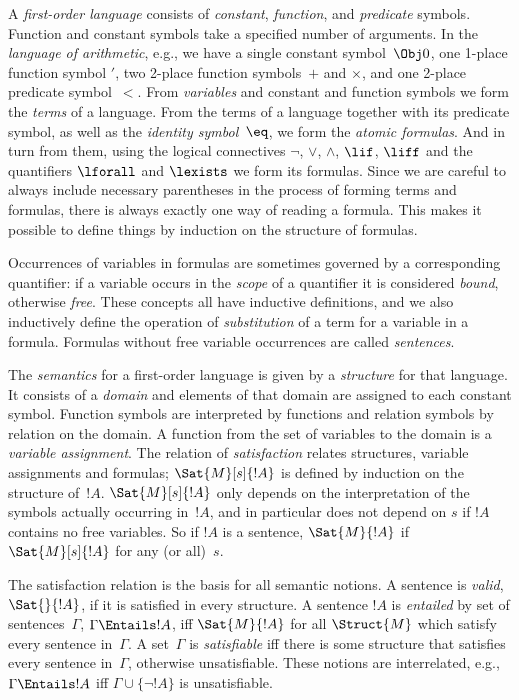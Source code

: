 A \emph{first-order language} consists of \emph{constant},
\emph{function}, and \emph{predicate} symbols. Function and constant
symbols take a specified number of arguments. In the \emph{language
  of arithmetic}, e.g., we have a single constant symbol~$\Obj 0$, one
1-place function symbol $\prime$, two 2-place function symbols~$+$ and
$\times$, and one 2-place predicate symbol~$<$. From \emph{variables}
and constant and function symbols we form the \emph{terms} of a
language. From the terms of a language together with its predicate
symbol, as well as the \emph{identity symbol}~$\eq$, we form the
  \emph{atomic formulas}. And in turn from them, using the logical
  connectives $\lnot$, $\lor$, $\land$, $\lif$, $\liff$ and the
  quantifiers $\lforall$ and $\lexists$ we form its formulas. Since
  we are careful to always include necessary parentheses in the
  process of forming terms and formulas, there is always exactly one
  way of reading a formula. This makes it possible to define things by
  induction on the structure of formulas.

Occurrences of variables in formulas are sometimes governed by a
corresponding quantifier: if a variable occurs in the \emph{scope} of
a quantifier it is considered \emph{bound}, otherwise
\emph{free}. These concepts all have inductive definitions, and we
also inductively define the operation of \emph{substitution} of a term
for a variable in a formula. Formulas without free variable
occurrences are called \emph{sentences}.

The \emph{semantics} for a first-order language is given by a
\emph{structure} for that language. It consists of a \emph{domain} and
elements of that domain are assigned to each constant symbol. Function
symbols are interpreted by functions and relation symbols by relation
on the domain. A function from the set of variables to the domain is
a \emph{variable assignment}. The relation of \emph{satisfaction}
relates structures, variable assignments and formulas;
$\Sat{M}[s]{!A}$ is defined by induction on the structure of~$!A$.
$\Sat{M}[s]{!A}$ only depends on the interpretation of the symbols
actually occurring in~$!A$, and in particular does not depend on $s$
if $!A$ contains no free variables. So if $!A$ is a sentence,
$\Sat{M}{!A}$ if $\Sat{M}[s]{!A}$ for any (or all)~$s$.

The satisfaction relation is the basis for all semantic notions. A
sentence is \emph{valid}, $\Sat{{}}{!A}$, if it is satisfied in every
structure. A sentence $!A$ is \emph{entailed} by set of
sentences~$\Gamma$, $\Gamma \Entails !A$, iff $\Sat{M}{!A}$ for all
$\Struct{M}$ which satisfy every sentence in~$\Gamma$. A set~$\Gamma$
is \emph{satisfiable} iff there is some structure that satisfies every
sentence in~$\Gamma$, otherwise unsatisfiable. These notions are
interrelated, e.g., $\Gamma \Entails !A$ iff $\Gamma \cup \{\lnot
!A\}$ is unsatisfiable.
